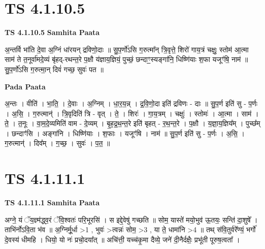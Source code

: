 \documentclass[17pt]{extarticle}
\begin{document}
\section*{ TS 4.1.10.5 }

\textbf{TS 4.1.10.5 } \newline
\textbf{Samhita Paata} \newline

अ॒न्तर्वि भा॑ति दे॒वा अ॒ग्निं धा॑रयन् द्रविणो॒दाः ॥ सु॒प॒र्णो॑ऽसि ग॒रुत्मा᳚न् त्रि॒वृत्ते॒ शिरो॑ गाय॒त्रं चक्षुः॒ स्तोम॑ आ॒त्मा साम॑ ते त॒नूर्वा॑मदे॒व्यं बृ॑हद्-रथन्त॒रे प॒क्षौ य॑ज्ञाय॒ज्ञियं॒ पुच्छं॒ छन्दाꣳ॒॒स्यङ्गा॑नि॒ धिष्णि॑याः श॒फा यजूꣳ॑षि॒ नाम॑ ॥ सु॒प॒र्णो॑ऽसि ग॒रुत्मा॒न् दिवं॑ गच्छ॒ सुवः॑ पत ॥ \newline

\textbf{Pada Paata} \newline

अ॒न्तः । वीति॑ । भा॒ति॒ । दे॒वाः । अ॒ग्निम् । धा॒र॒य॒न्न् । द्र॒वि॒णो॒दा इति॑ द्रविणः - दाः ॥ सु॒प॒र्ण इति॑ सु - प॒र्णः । अ॒सि॒ । ग॒रुत्मान्॑ । त्रि॒वृदिति॑ त्रि - वृत् । ते॒ । शिरः॑ । गा॒य॒त्रम् । चक्षुः॑ । स्तोमः॑ । आ॒त्मा । साम॑ । ते॒ । त॒नूः । वा॒म॒दे॒व्यमिति॑ वाम - दे॒व्यम् । बृ॒ह॒द्र॒थ॒न्त॒रे इति॑ बृहत् - र॒थ॒न्त॒रे । प॒क्षौ । य॒ज्ञा॒य॒ज्ञिय᳚म् । पुच्छ᳚म् । छन्दाꣳ॑सि । अङ्गा॑नि । धिष्णि॑याः । श॒फाः । यजूꣳ॑षि । नाम॑ ॥ सु॒प॒र्ण इति॑ सु - प॒र्णः । अ॒सि॒ । ग॒रुत्मान्॑ । दिव᳚म् । ग॒च्छ॒ । सुवः॑ । प॒त॒ ॥  \newline




\section*{ TS 4.1.11.1 }

\textbf{TS 4.1.11.1 } \newline
\textbf{Samhita Paata} \newline

अग्ने॒ यं ॅय॒ज्ञ्म॑द्ध्व॒रं ॅवि॒श्वतः॑ परि॒भूरसि॑ । स इद्दे॒वेषु॑ गच्छति ॥ सोम॒ यास्ते॑ मयो॒भुव॑ ऊ॒तयः॒ सन्ति॑ दा॒शुषे᳚ । ताभि॑र्नोऽवि॒ता भ॑व ॥ अ॒ग्निर्मू॒र्धा >1 , भुवः॑ >त्वन्नः॑ सोम॒ >3 , या ते॒ धामा॑नि >4 ॥ तथ् स॑वि॒तुर्वरे᳚ण्यं॒ भर्गो॑ दे॒वस्य॑ धीमहि । धियो॒ यो नः॑ प्रचो॒दया᳚त् ॥ अचि॑त्ती॒ यच्च॑कृ॒मा दैव्ये॒ जने॑ दी॒नैर्दक्षैः॒ प्रभू॑ती पूरुष॒त्वता᳚ । \newline
\end{document}

